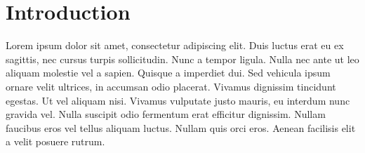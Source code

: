 \section{Introduction}

Lorem ipsum dolor sit amet, consectetur adipiscing elit. Duis luctus erat eu ex sagittis, nec cursus turpis sollicitudin. Nunc a tempor ligula. Nulla nec ante ut leo aliquam molestie vel a sapien. Quisque a imperdiet dui. Sed vehicula ipsum ornare velit ultrices, in accumsan odio placerat. Vivamus dignissim tincidunt egestas. Ut vel aliquam nisi. Vivamus vulputate justo mauris, eu interdum nunc gravida vel. Nulla suscipit odio fermentum erat efficitur dignissim. Nullam faucibus eros vel tellus aliquam luctus. Nullam quis orci eros. Aenean facilisis elit a velit posuere rutrum. 
